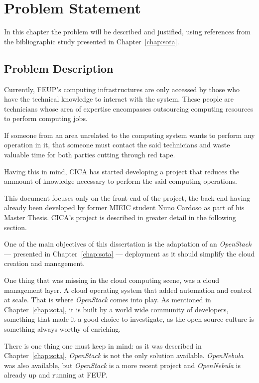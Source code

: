 \chapter{Problem Statement} \label{chap:chap3}

In this chapter the problem will be described and justified, using references from the bibliographic study presented in Chapter~\ref{chap:sota}.

\section{Problem Description}
 
 
Currently, FEUP's computing infrastructures are only accessed by those who have the technical knowledge to interact with the system. These people are technicians whose area of expertise encompasses outsourcing computing resources to perform computing jobs. 

If someone from an area unrelated to the computing system wants to perform any operation in it, that someone must contact the said technicians and waste valuable time for both parties cutting through red tape.

Having this in mind, CICA has started developing a project that reduces the ammount of knowledge necessary to perform the said computing operations.

This document focuses only on the front-end of the project, the back-end having already been developed by former MIEIC student Nuno Cardoso as part of his Master Thesis. CICA's project is described in greater detail in the following section.

One of the main objectives of this dissertation is the adaptation of an \textit{OpenStack} --- presented in Chapter~\ref{chap:sota} --- deployment as it should simplify the cloud creation and management.

One thing that was missing in the cloud computing scene, was a cloud management layer. A cloud operating system that added automation and control at scale. That is where \textit{OpenStack} comes into play. As mentioned in Chapter~\ref{chap:sota}, it is built by a world wide community of developers, something that made it a good choice to investigate, as the open source culture is something always worthy of enriching.~\cite{https://github.com/dellcloudedge/crowbar/wiki/OpenStack-Essex-Deploy-Day}

There is one thing one must keep in mind: as it was described in Chapter~\ref{chap:sota}, \textit{OpenStack} is not the only solution available. \textit{OpenNebula} was also available, but \textit{OpenStack} is a more recent project and \textit{OpenNebula} is already up and running at FEUP. 

